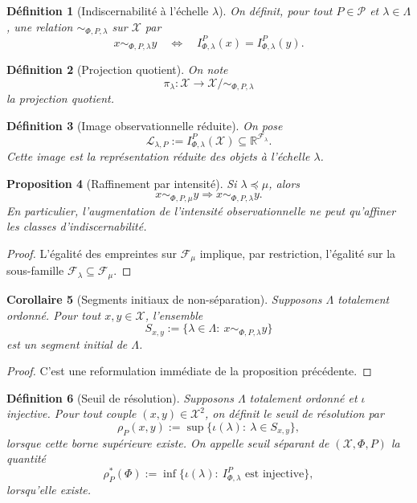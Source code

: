 \documentclass[11pt,a4paper,openany]{book}
\newtheorem{definition}{Définition}[chapter]
\newtheorem{proposition}[definition]{Proposition}
\newtheorem{corollary}[definition]{Corollaire}
\begin{document}
\begin{definition}[Indiscernabilité à l'échelle \(\lambda\)]
On définit, pour tout \(P\in\mathcal P\) et \(\lambda\in\Lambda\), une relation \(\sim_{\Phi,P,\lambda}\) sur \(\mathcal X\) par
\[
x\sim_{\Phi,P,\lambda}y
\quad\Longleftrightarrow\quad
I_{\Phi,\lambda}^P(x)=I_{\Phi,\lambda}^P(y).
\]
\end{definition}

\begin{definition}[Projection quotient]
On note
\[
\pi_\lambda:\mathcal X\longrightarrow \mathcal X/{\sim_{\Phi,P,\lambda}}
\]
la projection quotient.
\end{definition}

\begin{definition}[Image observationnelle réduite]
On pose
\[
\mathcal L_{\lambda,P}:=I_{\Phi,\lambda}^P(\mathcal X)\subseteq \mathbb R^{\mathcal F_\lambda}.
\]
Cette image est la représentation réduite des objets à l'échelle \(\lambda\).
\end{definition}

\begin{proposition}[Raffinement par intensité]
Si \(\lambda\preceq\mu\), alors
\[
x\sim_{\Phi,P,\mu}y \Longrightarrow x\sim_{\Phi,P,\lambda}y.
\]
En particulier, l'augmentation de l'intensité observationnelle ne peut qu'affiner les classes d'indiscernabilité.
\end{proposition}

\begin{proof}
L'égalité des empreintes sur \(\mathcal F_\mu\) implique, par restriction, l'égalité sur la sous-famille \(\mathcal F_\lambda\subseteq\mathcal F_\mu\).
\end{proof}

\begin{corollary}[Segments initiaux de non-séparation]
Supposons \(\Lambda\) totalement ordonné. Pour tout \(x,y\in\mathcal X\), l'ensemble
\[
S_{x,y}:=\{\lambda\in\Lambda:\ x\sim_{\Phi,P,\lambda}y\}
\]
est un segment initial de \(\Lambda\).
\end{corollary}

\begin{proof}
C'est une reformulation immédiate de la proposition précédente.
\end{proof}

\begin{definition}[Seuil de résolution]
Supposons \(\Lambda\) totalement ordonné et \(\iota\) injective. Pour tout couple \((x,y)\in\mathcal X^2\), on définit le seuil de résolution par
\[
\rho_P(x,y):=\sup\{\iota(\lambda):\ \lambda\in S_{x,y}\},
\]
lorsque cette borne supérieure existe. On appelle \emph{seuil séparant} de \((\mathcal X,\Phi,P)\) la quantité
\[
\rho_P^\ast(\Phi):=\inf\{\iota(\lambda):\ I_{\Phi,\lambda}^P \text{ est injective}\},
\]
lorsqu'elle existe.
\end{definition}
\end{document}
